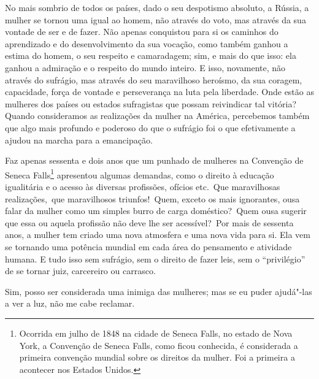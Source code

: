 No mais sombrio de todos os países, dado o seu despotismo absoluto, a
Rússia, a mulher se tornou uma igual ao homem, não através do voto, mas
através da sua vontade de ser e de fazer. Não apenas conquistou para
si os caminhos do aprendizado e do desenvolvimento da sua vocação,
como também ganhou a estima do homem, o seu respeito e camaradagem; sim, e
mais do que isso: ela ganhou a admiração e o respeito do mundo inteiro.
E isso, novamente, não através do sufrágio, mas através do seu
maravilhoso heroísmo, da sua coragem, capacidade, força de vontade e
perseverança na luta pela liberdade. Onde estão as mulheres dos países
ou estados sufragistas que possam reivindicar tal vitória? Quando
consideramos as realizações da mulher na América, percebemos também que
algo mais profundo e poderoso do que o sufrágio foi o que efetivamente a
ajudou na marcha para a emancipação.

Faz apenas sessenta e dois anos que um punhado de mulheres na Convenção
de Seneca Falls\footnote{Ocorrida em julho de 1848 na cidade de Seneca Falls, no estado de Nova York, a Convenção de Seneca Falls, como ficou conhecida, é considerada a primeira convenção mundial sobre os direitos da mulher. Foi a primeira a acontecer nos Estados Unidos.} apresentou algumas %
demandas, como o direito à educação igualitária e o acesso às diversas
profissões, ofícios etc.~Que maravilhosas realizações,~que maravilhosos
triunfos!~Quem, exceto os mais ignorantes, ousa falar da mulher como um
simples burro de carga doméstico?~Quem ousa sugerir que essa ou aquela
profissão não deve lhe ser acessível?~Por mais de sessenta anos, a
mulher tem criado uma nova atmosfera e uma nova vida para si. Ela vem se
tornando uma potência mundial em cada área do pensamento e atividade
humana. E tudo isso sem sufrágio, sem o direito de fazer leis, sem o
``privilégio'' de se tornar juiz, carcereiro ou carrasco.

Sim, posso ser considerada uma inimiga das mulheres; mas se eu puder
ajudá"-las a ver a luz, não me cabe reclamar.


